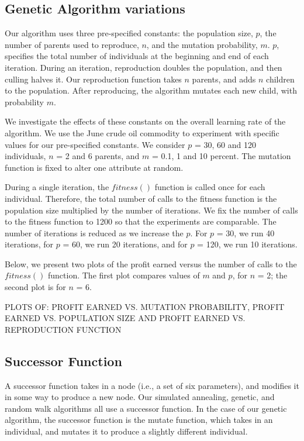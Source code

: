\documentclass[12pt]{article}
\begin{document}
\subsection{Genetic Algorithm variations}


Our algorithm uses three pre-specified constants: the population size, $p$, the
number of parents used to reproduce, $n$, and the mutation probability,
$m$. $p$, specifies the total number of individuals at the beginning and end of
each iteration. During an iteration, reproduction doubles the population, and
then culling halves it. Our reproduction function takes $n$ parents, and adds
$n$ children to the population. After reproducing, the algorithm mutates each
new child, with probability $m$.

We investigate the effects of these constants on the overall learning rate of
the algorithm. We use the June crude oil commodity to experiment with specific
values for our pre-specified constants. We consider $p$ = 30, 60 and 120
individuals, $n$ = 2 and 6 parents, and $m$ = 0.1, 1 and 10 percent.  The
mutation function is fixed to alter one attribute at random.

During a single iteration, the $fitness()$ function is called once for each
individual.  Therefore, the total number of calls to the fitness function is the
population size multiplied by the number of iterations.  We fix the number of
calls to the fitness function to 1200 so that the experiments are
comparable. The number of iterations is reduced as we increase the $p$. For $p$
= 30, we run 40 iterations, for $p$ = 60, we run 20 iterations, and for $p$ =
120, we run 10 iterations.


Below, we present two plots of the profit earned versus the number of calls to
the $fitness()$ function. The first plot compares values of $m$ and $p$, for $n$
= 2; the second plot is for $n$ = 6.


PLOTS OF: PROFIT EARNED VS. MUTATION PROBABILITY, PROFIT EARNED VS. POPULATION
SIZE AND PROFIT EARNED VS. REPRODUCTION FUNCTION


\subsection{Successor Function}

A successor function takes in a node (i.e., a set of six parameters), and
modifies it in some way to produce a new node.  Our simulated annealing,
genetic, and random walk algorithms all use a successor function.  In the case
of our genetic algorithm, the successor function is the mutate function, which
takes in an individual, and mutates it to produce a slightly different
individual.
\end{document}
